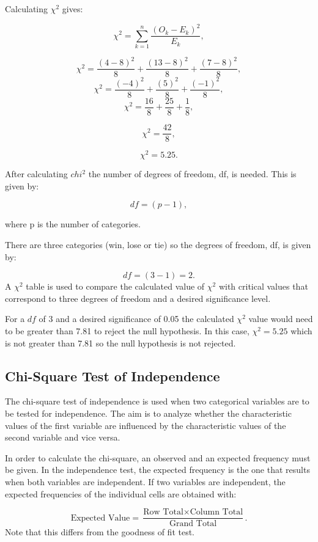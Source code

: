 \documentclass[
]{book}
\begin{document}
Calculating \(\chi^2\) gives:

\[\chi^2=\sum_{k=1}^{n}\frac{(O_k-E_k)^2}{E_k},\]

\[\chi^2=\frac{(4-8)^2}{8}+\frac{(13-8)^2}{8}+\frac{(7-8)^2}{8},\]
\[\chi^2=\frac{(-4)^2}{8}+\frac{(5)^2}{8}+\frac{(-1)^2}{8},\]
\[\chi^2=\frac{16}{8}+\frac{25}{8}+\frac{1}{8},\]

\[\chi^2=\frac{42}{8},\]

\[\chi^2=5.25.\]

After calculating \(chi^2\) the number of degrees of freedom, df, is needed. This is given by:

\[df=(p-1),\]

where p is the number of categories.

There are three categories (win, lose or tie) so the degrees of freedom, df, is given by:

\[df=(3-1)=2.\]
A \(\chi^2\) table is used to compare the calculated value of \(\chi^2\) with critical values that correspond to three degrees of freedom and a desired significance level.

For a \(df\) of 3 and a desired significance of 0.05 the calculated \(\chi^2\) value would need to be greater than 7.81 to reject the null hypothesis. In this case, \(\chi^2=5.25\) which is not greater than 7.81 so the null hypothesis is not rejected.

\hypertarget{chi-square-test-of-independence}{%
\subsection{Chi-Square Test of Independence}\label{chi-square-test-of-independence}}

The chi-square test of independence is used when two categorical variables are to be tested for independence. The aim is to analyze whether the characteristic values of the first variable are influenced by the characteristic values of the second variable and vice versa.

In order to calculate the chi-square, an observed and an expected frequency must be given. In the independence test, the expected frequency is the one that results when both variables are independent. If two variables are independent, the expected frequencies of the individual cells are obtained with:

\[\textrm{Expected Value}= \frac{\textrm{Row Total} \times \textrm{Column Total}}{\textrm{Grand Total}}.\]
Note that this differs from the goodness of fit test.
\end{document}
